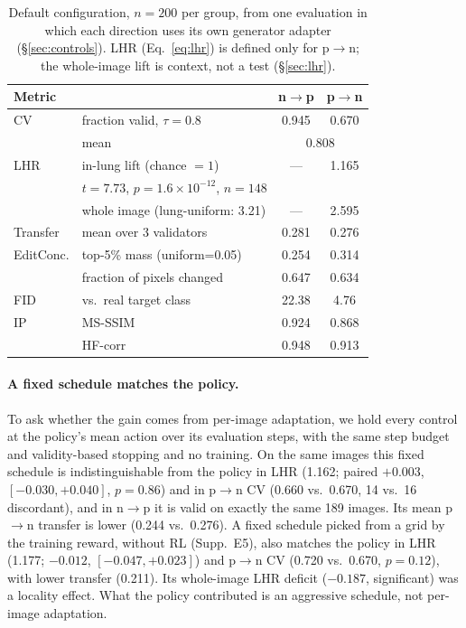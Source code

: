 \begin{table}[t]
\centering
\caption{Default configuration, $n=200$ per group, from one evaluation in which each direction uses its own generator adapter (\S\ref{sec:controls}). LHR (Eq.~\ref{eq:lhr}) is defined only for p$\to$n; the whole-image lift is context, not a test (\S\ref{sec:lhr}).}
\label{tab:main-results}
\small
\begin{tabular}{@{}llcc@{}}
\toprule
Metric & & n$\to$p & p$\to$n \\
\midrule
CV & fraction valid, $\tau{=}0.8$ & 0.945 & 0.670 \\
& mean & \multicolumn{2}{c}{0.808} \\
LHR & in-lung lift (chance $=1$) & --- & 1.165 \\
& \multicolumn{3}{l}{\footnotesize $t=7.73$, $p=1.6\times10^{-12}$, $n=148$} \\
& whole image (lung-uniform: 3.21) & --- & 2.595 \\
Transfer & mean over 3 validators & 0.281 & 0.276 \\
EditConc. & top-5\% mass (uniform=0.05) & 0.254 & 0.314 \\
& fraction of pixels changed & 0.647 & 0.634 \\
FID & vs.\ real target class & 22.38 & 4.76 \\
IP & MS-SSIM & 0.924 & 0.868 \\
& HF-corr & 0.948 & 0.913 \\
\bottomrule
\end{tabular}
\end{table}

\paragraph{A fixed schedule matches the policy.} To ask whether the gain comes from per-image adaptation, we hold every control at the policy's mean action over its evaluation steps, with the same step budget and validity-based stopping and no training. On the same images this fixed schedule is indistinguishable from the policy in LHR (1.162; paired $+0.003$, $[-0.030, +0.040]$, $p=0.86$) and in p$\to$n CV (0.660 vs.\ 0.670, 14 vs.\ 16 discordant), and in n$\to$p it is valid on exactly the same 189 images. Its mean p$\to$n transfer is lower (0.244 vs.\ 0.276). A fixed schedule picked from a grid by the training reward, without RL (Supp.~E5), also matches the policy in LHR (1.177; $-0.012$, $[-0.047, +0.023]$) and p$\to$n CV (0.720 vs.\ 0.670, $p=0.12$), with lower transfer (0.211). Its whole-image LHR deficit ($-0.187$, significant) was a locality effect. What the policy contributed is an aggressive schedule, not per-image adaptation.

